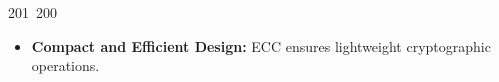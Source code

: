 201~200~\documentclass{article}
\begin{document}
\begin{itemize}
	                                                                                                                                                                                                                                                                                                	                                                                                                                                        	    	                                                                                                	                                                                                                                                                                                                                                                                                                                                	                                                                        	                                                                        	                                                                                                                                        	                                                                                                                                                                                                                        	                                                                    \item \textbf{Compact and Efficient Design:} ECC ensures lightweight cryptographic operations.
	                                                                                                                                                                                                                                                                                                	                                                                                                                                        	    	                                                                                                	                                                                                                                                                                                                                                                                                                                                	                                                                        	                                                                        	                                                                                                                                        	                                                                                                                                                                                                                        	                                                                    \end{itemize}
\end{document}
